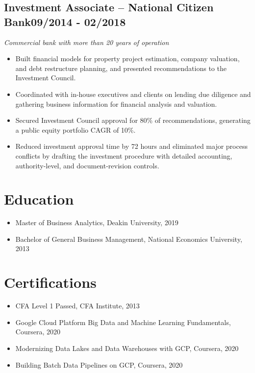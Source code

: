 \documentclass[11pt,a4paper]{article}
\newcommand{\role}[3]{%
  \subsection*{#1 \textnormal{--} \textbf{#2}\hfill #3}}
\begin{document}
\role{Investment Associate}{National Citizen Bank}{09/2014 - 02/2018}
\textit{Commercial bank with more than 20 years of operation}
\begin{itemize}
  \item Built financial models for property project estimation, company valuation, and debt restructure planning, and presented recommendations to the Investment Council.
  \item Coordinated with in-house executives and clients on lending due diligence and gathering business information for financial analysis and valuation.
  \item Secured Investment Council approval for 80\% of recommendations, generating a public equity portfolio CAGR of 10\%.
  \item Reduced investment approval time by 72 hours and eliminated major process conflicts by drafting the investment procedure with detailed accounting, authority-level, and document-revision controls.
\end{itemize}

\section*{Education}
\begin{itemize}
  \item Master of Business Analytics, Deakin University, 2019
  \item Bachelor of General Business Management, National Economics University, 2013
\end{itemize}

\section*{Certifications}
\begin{itemize}
  \item CFA Level 1 Passed, CFA Institute, 2013
  \item Google Cloud Platform Big Data and Machine Learning Fundamentals, Coursera, 2020
  \item Modernizing Data Lakes and Data Warehouses with GCP, Coursera, 2020
  \item Building Batch Data Pipelines on GCP, Coursera, 2020
\end{itemize}

\end{document}
